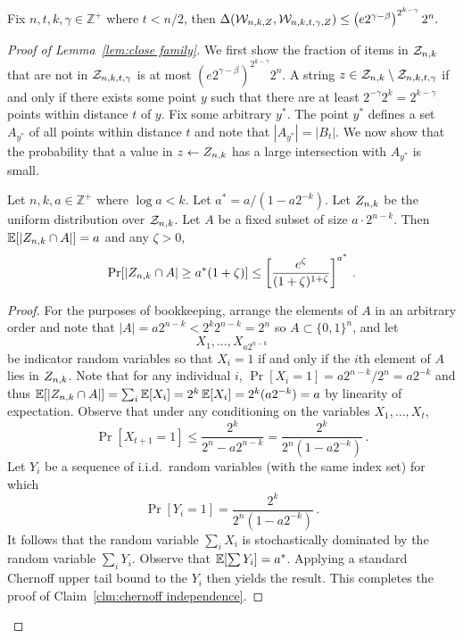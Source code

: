 

 \begin{lemma}
 \label{lem:close family}
Fix $n, t, k, \gamma  \in \mathbb{Z}^+$ where $t<n/2$, then
$\Delta(\mathcal{W}_{n,k, Z}, \mathcal{W}_{n,k,t,\gamma, Z}) \le \left(e2^{\gamma-\beta}\right)^{2^{k-\gamma}}2^n.$
\end{lemma}

\begin{proof}[Proof of Lemma~\ref{lem:close family}]
We first show the fraction of items in $\mathcal{Z}_{n,k}$ that are not in $\mathcal{Z}_{n,k,t,\gamma}$ is at most $\left(e2^{\gamma-\beta}\right)^{2^{k-\gamma}}2^n$.  
A string $z\in \mathcal{Z}_{n,k}\setminus \mathcal{Z}_{n,k,t,\gamma}$ if and only if there exists some point $y$ such that there are at least $2^{-\gamma}2^k = 2^{k-\gamma}$ points within distance $t$ of $y$.  Fix some arbitrary $y^*$. The point $y^*$ defines a set $A_{y^*}$ of all points within distance $t$ and note that $|A_{y^*}| = |B_t|$.  We now show that the probability that a value in $z\leftarrow Z_{n,k}$ has a large intersection with $A_{y^*}$ is small.  

  \begin{claim}
  \label{clm:chernoff independence}
  Let $n,k,a\in\mathbb{Z}^+$ where $\log a < k$.  Let $a^* = a/(1 - a2^{-k})$. Let $Z_{n,k}$
  be the uniform distribution over $\mathcal{Z}_{n,k}$. Let $A$ be a fixed subset of size $a \cdot 2^{n-k}$. Then
  $\operatorname*{\mathbb{E}}[|Z_{n,k} \cap A|] = a$ and any $\zeta > 0$,
  \[
    \Pr[|Z_{n,k} \cap A| \geq a^*(1 + \zeta)] \leq \left[\frac{e^\zeta}{(1+\zeta)^{1+\zeta}}\right]^{a^*}\,.
  \]
\end{claim}
\begin{proof}
  For the purposes of bookkeeping, arrange the elements of $A$ in an
  arbitrary order and note that $|A| = a2^{n-k} < 2^k2^{n-k} = 2^n$ so $A\subset \{0,1\}^n$, and let
  \[
    X_1, \ldots, X_{a2^{n-k}}
  \]
  be indicator random variables so that $X_i = 1$ if and only if the
  $i$th element of $A$ lies in $Z_{n,k}$.  Note that for any individual $i$, $\Pr[X_i =1] =a2^{n-k}/2^n = a2^{-k}$ and thus $\operatorname*{\mathbb{E}}[|Z_{n,k}\cap A|] =\sum_i \operatorname*{\mathbb{E}}[X_i] = 2^k \operatorname*{\mathbb{E}}[X_i] =2^k (a2^{-k})= a$ by linearity of expectation.  Observe that under any conditioning on the
  variables $X_1, \ldots, X_t$,
  \[
    \Pr[X_{t+1} = 1] \leq \frac{2^k}{2^n - a2^{n-k}} = \frac{2^k}{2^n(1 - a2^{-k})}\,.
  \]
   Let $Y_i$ be a sequence of
  i.i.d.\ random variables (with the same index set) for which
  \[
    \Pr[Y_i = 1] = \frac{2^{k}}{2^n(1 - a2^{-k})}\,.
  \]It follows that the random variable $\sum_i X_i$ is stochastically
  dominated by the random variable $\sum_i Y_i$. Observe that
  $\operatorname*{\mathbb{E}}[\sum Y_i] = a^*$. Applying a standard Chernoff upper tail
  bound to the $Y_i$ then yields the result. This completes the proof of Claim~\ref{clm:chernoff independence}.
\end{proof}


\end{proof}
